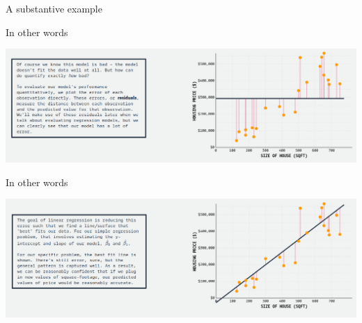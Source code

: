 \documentclass[australian,ignorenonframetext,aspectratio=169]{beamer}
\begin{document}
\begin{frame}{A substantive example}
\protect\hypertarget{a-substantive-example}{}


\end{frame}

\begin{frame}{In other words}
\protect\hypertarget{in-other-words}{}

\begin{center}\includegraphics[width=1\linewidth]{../graphs/predict-2} \end{center}

\end{frame}

\begin{frame}{In other words}
\protect\hypertarget{in-other-words-1}{}

\begin{center}\includegraphics[width=1\linewidth]{../graphs/predict-3} \end{center}

\end{frame}
\end{document}
